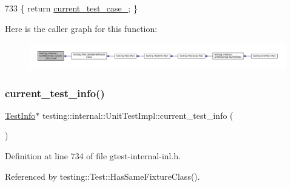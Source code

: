 \begin{DoxyCode}
733 \{ \textcolor{keywordflow}{return} \hyperlink{classtesting_1_1internal_1_1UnitTestImpl_a3b346729d3940f065e05c69c434ebb3f}{current\_test\_case\_}; \}
\end{DoxyCode}
Here is the caller graph for this function\+:
\nopagebreak
\begin{figure}[H]
\begin{center}
\leavevmode
\includegraphics[width=350pt]{classtesting_1_1internal_1_1UnitTestImpl_ae1f98925197cf344a23a7400deeee4dc_icgraph}
\end{center}
\end{figure}
\mbox{\label{classtesting_1_1internal_1_1UnitTestImpl_a8d303ebdcf5989e96d3ed96fb7255102}} 
\subsubsection{\texorpdfstring{current\+\_\+test\+\_\+info()}{current\_test\_info()}\hspace{0.1cm}{\footnotesize\ttfamily [1/2]}}
{\footnotesize\ttfamily \hyperlink{classtesting_1_1TestInfo}{Test\+Info}$\ast$ testing\+::internal\+::\+Unit\+Test\+Impl\+::current\+\_\+test\+\_\+info (\begin{DoxyParamCaption}{ }\end{DoxyParamCaption})\hspace{0.3cm}{\ttfamily [inline]}}



Definition at line 734 of file gtest-\/internal-\/inl.\+h.



Referenced by testing\+::\+Test\+::\+Has\+Same\+Fixture\+Class().


